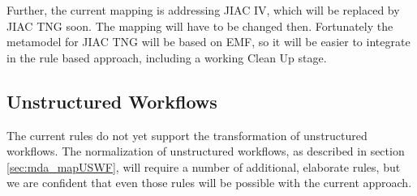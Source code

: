 Further, the current mapping is addressing JIAC IV, which will be replaced by JIAC TNG soon. The mapping will have to be changed then. Fortunately the metamodel for JIAC TNG will be based on EMF, so it will be easier to integrate in the rule based approach, including a working Clean Up stage.

% 
% 
% 
% 
% 


\subsection{Unstructured Workflows}

The current rules do not yet support the transformation of unstructured workflows. The normalization of unstructured workflows, as described in section \ref{sec:mda_mapUSWF}, will require a number of additional, elaborate rules, but we are confident that even those rules will be possible with the current approach.

